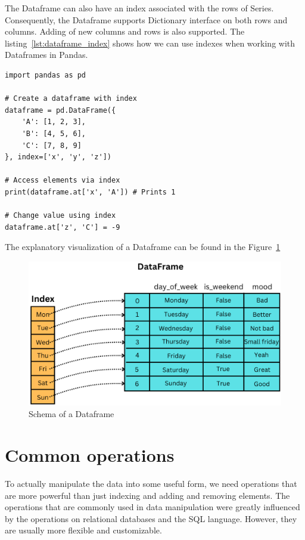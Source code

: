 The Dataframe can also have an index associated with the rows of Series.
Consequently, the Dataframe supports Dictionary interface on both rows and columns.
Adding of new columns and rows is also supported.
The listing~\ref{lst:dataframe_index} shows how we can use indexes when working with Dataframes in Pandas.

\begin{lstlisting}[caption=Index on a Dataframe, label={lst:dataframe_index}, captionpos=b]
import pandas as pd

# Create a dataframe with index
dataframe = pd.DataFrame({
    'A': [1, 2, 3],
    'B': [4, 5, 6],
    'C': [7, 8, 9]
}, index=['x', 'y', 'z'])

# Access elements via index
print(dataframe.at['x', 'A']) # Prints 1

# Change value using index
dataframe.at['z', 'C'] = -9
\end{lstlisting}

The explanatory visualization of a Dataframe can be found in the Figure~\ref{fig:dataframe_schema}

\begin{figure}[H]
    \caption{Schema of a Dataframe}
    \label{fig:dataframe_schema}
    \centering
    \includegraphics[scale=0.4]{img/Dataframe}
\end{figure}


\section{Common operations} %

To actually manipulate the data into some useful form, we need operations that are more powerful than just indexing and
adding and removing elements.
The operations that are commonly used in data manipulation were greatly influenced by the operations on relational
databases and the SQL language.
However, they are usually more flexible and customizable. %

